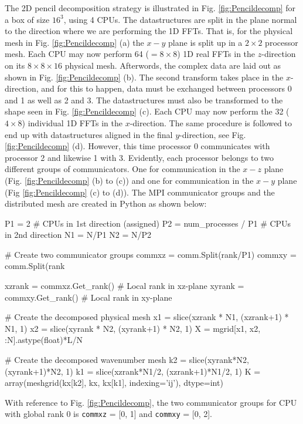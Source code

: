 \documentclass[11pt, oneside]{article}
\newcommand{\inpyth}{\lstinline[style=pythonstyle, basicstyle=\ttfamily]} %[]%
\begin{document}
The 2D pencil decomposition strategy is illustrated in Fig. \ref{fig:Pencildecomp} for a box of size $16^3$, using 4 CPUs. The datastructures are split in the plane normal to the direction where we are performing the 1D FFTs. That is, for the physical mesh in Fig. \ref{fig:Pencildecomp} (a) the $x-y$ plane is split up in a $2\times2$ processor mesh. Each CPU may now perform 64 ($= 8 \times 8$) 1D real FFTs in the $z$-direction on its $8 \times 8 \times 16$ physical mesh. Afterwords, the complex data are laid out as shown in Fig. \ref{fig:Pencildecomp} (b). The second transform takes place in the $x$-direction, and for this to happen, data must be exchanged between processors 0 and 1 as well as 2 and 3. The datastructures must also be transformed to the shape seen in Fig. \ref{fig:Pencildecomp} (c). Each CPU may now perform the 32 ($4 \times 8$) individual 1D FFTs in the $x$-direction. The same procedure is followed to end up with datastructures aligned in the final $y$-direction, see Fig. \ref{fig:Pencildecomp} (d). However, this time processor 0 communicates with processor 2 and likewise 1 with 3. Evidently, each processor belongs to two different groups of communicators. One for communication in the $x-z$ plane (Fig. \ref{fig:Pencildecomp} (b) to (c)) and one for communication in the $x-y$ plane (Fig \ref{fig:Pencildecomp} (c) to (d)). The MPI communicator groups and the distributed mesh are created in Python as shown below:

\begin{python}
P1 = 2                     # CPUs in 1st direction (assigned)
P2 = num_processes / P1    # CPUs in 2nd direction
N1 = N/P1
N2 = N/P2

# Create two communicator groups
commxz = comm.Split(rank/P1)
commxy = comm.Split(rank%
    
xzrank = commxz.Get_rank() # Local rank in xz-plane
xyrank = commxy.Get_rank() # Local rank in xy-plane
    
# Create the decomposed physical mesh
x1 = slice(xzrank * N1, (xzrank+1) * N1, 1)
x2 = slice(xyrank * N2, (xyrank+1) * N2, 1)
X = mgrid[x1, x2, :N].astype(float)*L/N

# Create the decomposed wavenumber mesh
k2 = slice(xyrank*N2, (xyrank+1)*N2, 1)
k1 = slice(xzrank*N1/2, (xzrank+1)*N1/2, 1)
K = array(meshgrid(kx[k2], kx, kx[k1], indexing='ij'), dtype=int)
\end{python}
With reference to Fig. \ref{fig:Pencildecomp}, the two communicator groups for CPU with global rank 0 is \inpyth{commxz} = [0, 1] and \inpyth{commxy} = [0, 2].
\end{document}

